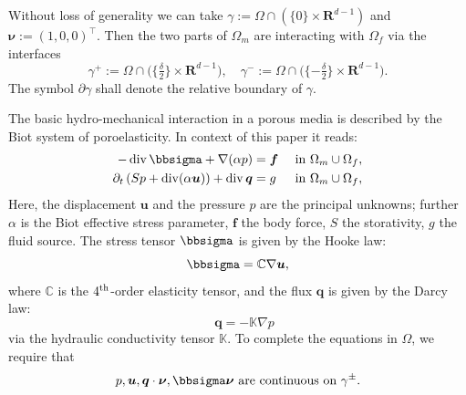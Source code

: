 \documentclass[a4paper]{article}
\def\div{\operatorname{div}}
\def\ff{\vc f}
\def\nnu{\vc\nu}
\def\prtl{\partial}
\def\qq{\vc q}
\def\Real{{\mathbf R}}
\def\tn#1{{\mathbb{#1}}}    %
\def\uu{\vc u}
\def\vc#1{\mathbf{\boldsymbol{#1}}}     %
\newcommand{\eq}[1]{\begin{equation}#1\end{equation}}
\begin{document}
Without loss of generality we can take $\gamma:=\Omega\cap\left(\{0\}\times\Real^{d-1}\right)$ and $\nnu:=(1,0,0)^\top$.
Then the two parts of $\Omega_m$ are interacting with $\Omega_f$ via the interfaces
\eq{ \gamma^+:=\Omega\cap\big( \{\tfrac\delta2\}\times \Real^{d-1}\big), \quad \gamma^-:=\Omega\cap\big( \{ -\tfrac\delta2\}\times \Real^{d-1}\big). }
The symbol $\prtl\gamma$ shall denote the relative boundary of $\gamma$.

The basic hydro-mechanical interaction in a porous media is described by the Biot system of poroelasticity.
In context of this paper it reads:
\begin{subequations}
\label{eq:biot}
\begin{align}
    \label{eq:lin_el}
    -\div \bbsigma + \nabla(\alpha p) &= \ff &&\mbox{ in }\Omega_m\cup\Omega_f,\\
\label{eq:biot_darcy}    \prtl_t\left(Sp + \div(\alpha\uu)\right) + \div\qq &= g &&\mbox{ in }\Omega_m\cup\Omega_f,
\end{align}
\end{subequations}
Here, the displacement $\uu$ and the pressure $p$ are the principal unknowns; further $\alpha$ is the Biot effective stress parameter, $\ff$ the body force, $S$ the storativity, $g$ the fluid source.
The stress tensor $\bbsigma$ is given by the Hooke law:
\eq{ \bbsigma = \tn C\nabla\uu, }
where $\tn C$ is the $4^{\rm th}$-order elasticity tensor, and the flux $\qq$ is given by the Darcy law:
\eq{ \quad \qq = -\tn K\nabla p }
via the hydraulic conductivity tensor $\tn K$.
To complete the equations in $\Omega$, we require that
\eq{ \label{eq:continuity_on_gamma_pm} p,\uu,\qq\cdot\nnu,\bbsigma\nnu \mbox{ are continuous on } \gamma^\pm. }
\end{document}
